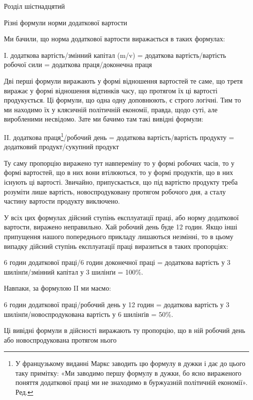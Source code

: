 Розділ шістнадцятий

Різні формули норми додаткової вартости

Ми бачили, що норма додаткової вартости виражається в таких
формулах:

I. додаткова вартість/змінний капітал (m/v) =
додаткова вартість/вартість робочої сили =
додаткова праця/доконечна праця

Дві перші формули виражають у формі відношення вартостей
те саме, що третя виражає у формі відношення відтинків часу,
що протягом їх ці вартості продукується. Ці формули, що одна
одну доповнюють, є строго логічні. Тим то ми находимо їх у клясичній
політичній економії, правда, щодо суті, але виробленими
несвідомо. Зате ми бачимо там такі вивідні формули:

II. додаткова праця\footnote*{
У французькому виданні Маркс заводить цю формулу в дужки
і дає до цього таку примітку: «Ми заводимо першу формулу в дужки,
бо ясно вираженого поняття додаткової праці ми не знаходимо в буржуазній
політичній економії». Ред.
}/робочий день =
додаткова вартість/вартість продукту =
додатковий продукт/сукупний продукт

Ту саму пропорцію виражено тут навпереміну то у формі
робочих часів, то у формі вартостей, що в них вони втілюються,
то у формі продуктів, що в них існують ці вартості. Звичайно,
припускається, що під вартістю продукту треба розуміти лише
вартість, новоспродуковану протягом робочого дня, а сталу частину
вартости продукту виключено.

У всіх цих формулах дійсний ступінь експлуатації праці, або
норму додаткової вартости, виражено неправильно. Хай робочий
день буде 12 годин. Якщо інші припущення нашого попереднього
прикладу лишаються незмінні, то в цьому випадку дійсний
ступінь експлуатації праці виразиться в таких пропорціях:

6    годин додаткової праці/6 годин доконечної праці =
додаткова вартість у 3 шилінґи/змінний капітал у 3 шилінґи = 100\%.

Навпаки, за формулою II ми маємо:

6 годин додаткової праці/робочий день у 12 годин =
додаткова вартість у 3 шилінґи/новоспродукована вартість у 6 шилінґів =
50\%.

Ці вивідні формули в дійсності виражають ту пропорцію,
що в ній робочий день або новоспродукована протягом нього